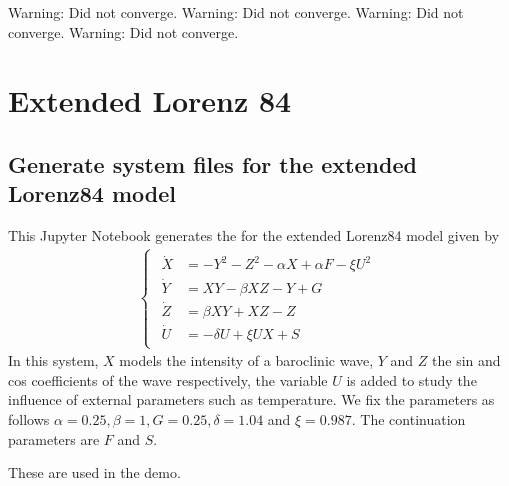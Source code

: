\documentclass[letterpaper,10pt,english]{jupyterBook}
\begin{document}
\begin{sphinxVerbatim}[commandchars=\\\{\}]
Warning: Did not converge.
Warning: Did not converge.
Warning: Did not converge.
Warning: Did not converge.
\end{sphinxVerbatim}

\noindent{}


\part{Extended Lorenz 84}


\chapter{Generate system files for the extended Lorenz\sphinxhyphen{}84 model}
\label{\detokenize{Lorenz84GenSym:generate-system-files-for-the-extended-lorenz-84-model}}\label{\detokenize{Lorenz84GenSym::doc}}
\sphinxAtStartPar
This Jupyter Notebook generates the  for the extended Lorenz\sphinxhyphen{}84 model
given by
\begin{equation*}
\begin{split}
\begin{cases}
\begin{aligned}
\dot{X} &=-Y^{2}-Z^{2}-\alpha X+\alpha F-\xi U^{2} \\
\dot{Y} &=X Y-\beta X Z-Y+G \\
\dot{Z} &=\beta X Y+X Z-Z \\
\dot{U} &=-\delta U+\xi U X+S
\end{aligned}
\end{cases}
\end{split}
\end{equation*}
\sphinxAtStartPar
In this system, \(X\) models the intensity of a baroclinic wave, \(Y\) and \(Z\) the
sin and cos coefficients of the wave respectively, the variable \(U\) is added to
study the influence of external parameters such as temperature. We fix the
parameters as follows \(\alpha=0.25, \beta=1, G=0.25, \delta=1.04\) and
\(\xi=0.987\). The continuation parameters are \(F\) and \(S\).

\sphinxAtStartPar
These are used in the {\hyperref[\detokenize{extendedLorenz84model::doc}]{}} demo.
\end{document}
